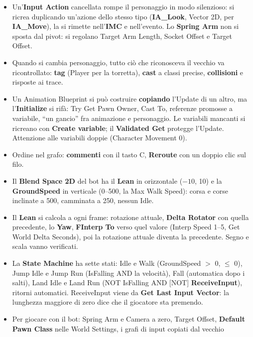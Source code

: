 \begin{itemize}
  \item Un'\textbf{Input Action} cancellata rompe il personaggio in modo silenzioso: si
        ricrea duplicando un'azione dello stesso tipo (\textbf{IA\_Look}, Vector 2D, per
        \textbf{IA\_Move}), la si rimette nell'\textbf{IMC} e nell'evento. Lo
        \textbf{Spring Arm} non si sposta dal pivot: si regolano Target Arm Length,
        Socket Offset e Target Offset.
  \item Quando si cambia personaggio, tutto ciò che riconosceva il vecchio va
        ricontrollato: \textbf{tag} (Player per la torretta), \textbf{cast} a classi
        precise, \textbf{collisioni} e risposte ai trace.
  \item Un Animation Blueprint si può costruire \textbf{copiando} l'Update di un altro, ma
        l'\textbf{Initialize} si rifà: Try Get Pawn Owner, Cast To, referenze promosse a
        variabile, ``un gancio'' fra animazione e personaggio. Le variabili mancanti si
        ricreano con \textbf{Create variable}; il \textbf{Validated Get} protegge l'Update.
        Attenzione alle variabili doppie (Character Movement 0).
  \item Ordine nel grafo: \textbf{commenti} con il tasto C, \textbf{Reroute} con un doppio
        clic sul filo.
  \item Il \textbf{Blend Space 2D} del bot ha il \textbf{Lean} in orizzontale ($-10$,
        10) e la \textbf{GroundSpeed} in verticale (0--500, la Max Walk Speed): corsa e
        corse inclinate a 500, camminata a 250, nessun Idle.
  \item Il \textbf{Lean} si calcola a ogni frame: rotazione attuale, \textbf{Delta
        Rotator} con quella precedente, lo \textbf{Yaw}, \textbf{FInterp To} verso quel
        valore (Interp Speed 1--5, Get World Delta Seconds), poi la rotazione attuale
        diventa la precedente. Segno e scala vanno verificati.
  \item La \textbf{State Machine} ha sette stati: Idle e Walk (GroundSpeed $>$ 0, $\le$
        0), Jump Idle e Jump Run (IsFalling AND la velocità), Fall (automatica dopo i
        salti), Land Idle e Land Run (NOT IsFalling AND [NOT] \textbf{ReceiveInput}),
        ritorni automatici. ReceiveInput viene da \textbf{Get Last Input Vector}: la
        lunghezza maggiore di zero dice che il giocatore sta premendo.
  \item Per giocare con il bot: Spring Arm e Camera a zero, Target Offset, \textbf{Default
        Pawn Class} nelle World Settings, i grafi di input copiati dal vecchio

\end{itemize}
